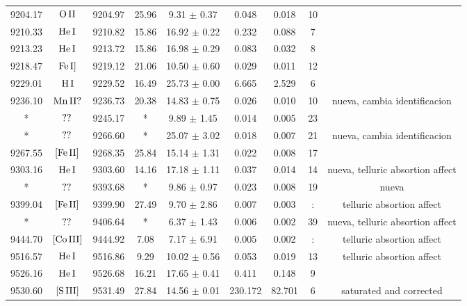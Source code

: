\documentclass{article}
\begin{document}
\begin{table*}
\begin{adjustbox}{width=\textwidth}
\begin{tabular}{ccccccccc}
9204.17 & $\mbox{O}\thinspace \mbox{II}$ & 9204.97 & 25.96 & 9.31 $\pm$ 0.37 & 0.048 & 0.018 & 10 &  \\
9210.33 & $\mbox{He}\thinspace \mbox{I}$ & 9210.82 & 15.86 & 16.92 $\pm$ 0.22 & 0.232 & 0.088 & 7 &  \\
9213.23 & $\mbox{He}\thinspace \mbox{I}$ & 9213.72 & 15.86 & 16.98 $\pm$ 0.29 & 0.083 & 0.032 & 8 &  \\
9218.47 & $\mbox{Fe}\thinspace \mbox{I]}$ & 9219.12 & 21.06 & 10.50 $\pm$ 0.60 & 0.029 & 0.011 & 12 &  \\
9229.01 & $\mbox{H}\thinspace \mbox{I}$ & 9229.52 & 16.49 & 25.73 $\pm$ 0.00 & 6.665 & 2.529 & 6 &  \\
9236.10 & $\mbox{Mn}\thinspace \mbox{II?}$ & 9236.73 & 20.38 & 14.83 $\pm$ 0.75 & 0.026 & 0.010 & 10 &  nueva, cambia identificacion \\
* & $\mbox{??}\thinspace \mbox{}$ & 9245.17 & * & 9.89 $\pm$ 1.45 & 0.014 & 0.005 & 23 &  \\
* & $\mbox{??}\thinspace \mbox{}$ & 9266.60 & * & 25.07 $\pm$ 3.02 & 0.018 & 0.007 & 21 &  nueva, cambia identificacion \\
9267.55 & $\mbox{[Fe}\thinspace \mbox{II]}$ & 9268.35 & 25.84 & 15.14 $\pm$ 1.31 & 0.022 & 0.008 & 17 &  \\
9303.16 & $\mbox{He}\thinspace \mbox{I}$ & 9303.60 & 14.16 & 17.18 $\pm$ 1.11 & 0.037 & 0.014 & 14 &  nueva, telluric absortion affect \\
* & $\mbox{??}\thinspace \mbox{}$ & 9393.68 & * & 9.86 $\pm$ 0.97 & 0.023 & 0.008 & 19 &  nueva \\
9399.04 & $\mbox{[Fe}\thinspace \mbox{II]}$ & 9399.90 & 27.49 & 9.70 $\pm$ 2.86 & 0.007 & 0.003 & : &  telluric absortion affect \\
* & $\mbox{??}\thinspace \mbox{}$ & 9406.64 & * & 6.37 $\pm$ 1.43 & 0.006 & 0.002 & 39 &  nueva, telluric absortion affect \\
9444.70 & $\mbox{[Co}\thinspace \mbox{III]}$ & 9444.92 & 7.08 & 7.17 $\pm$ 6.91 & 0.005 & 0.002 & : &  telluric absortion affect \\
9516.57 & $\mbox{He}\thinspace \mbox{I}$ & 9516.86 & 9.29 & 10.02 $\pm$ 0.56 & 0.053 & 0.019 & 13 &  telluric absortion affect \\
9526.16 & $\mbox{He}\thinspace \mbox{I}$ & 9526.68 & 16.21 & 17.65 $\pm$ 0.41 & 0.411 & 0.148 & 9 &  \\
9530.60 & $\mbox{[S}\thinspace \mbox{III]}$ & 9531.49 & 27.84 & 14.56 $\pm$ 0.01 & 230.172 & 82.701 & 6 &  saturated and corrected \\

\end{tabular}
\end{adjustbox}
\end{table*}
\end{document}
